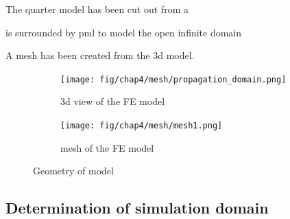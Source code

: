 The quarter model has been cut out from a 

is surrounded by pml to model the open infinite domain

A mesh has been created from the 3d model.

\begin{figure}[H]
	\centering
	\begin{subfigure}[b]{0.45\textwidth}
		\centering
		\texttt{[image: fig/chap4/mesh/propagation\_domain.png]}
		\caption{3d view of the FE model}
		\label{fig:propagation_domain}
	\end{subfigure}
	\hfill
	\begin{subfigure}[b]{0.45\textwidth}
		\centering
		\texttt{[image: fig/chap4/mesh/mesh1.png]}
		\caption{mesh of the FE model}
		\label{fig:mesh_model}
	\end{subfigure}
	\caption{Geometry of model}
\end{figure}




\subsection*{Determination of simulation domain}

